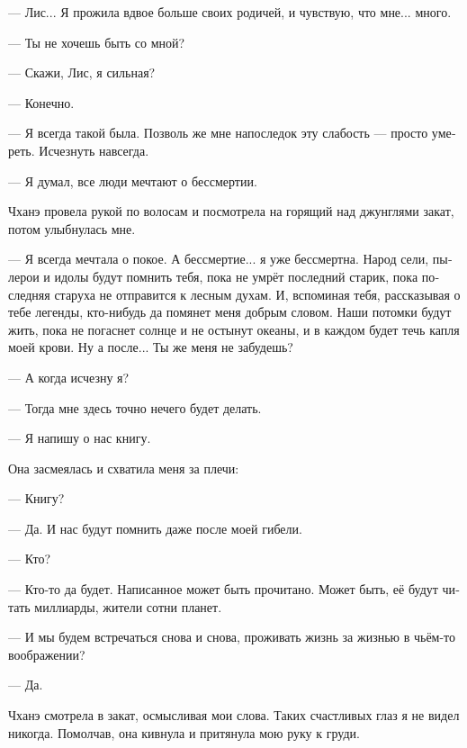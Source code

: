 \documentclass[a4paper,12pt,fleqn]{book}\usepackage{polyglossia}\setdefaultlanguage[babelshorthands=true]{russian}\setotherlanguage{english}\defaultfontfeatures{Ligatures=TeX,Mapping=tex-text}\usepackage{xcolor}\newcommand{\ml}[3]{#2}
\begin{document}
{--- Лис...
Я прожила вдвое больше своих родичей, и чувствую, что мне... много.

--- Ты не хочешь быть со мной?

--- Скажи, Лис, я сильная?

--- Конечно.

--- Я всегда такой была.
Позволь же мне напоследок эту слабость --- просто умереть.
Исчезнуть навсегда.

--- Я думал, все люди мечтают о бессмертии.

Чханэ провела рукой по волосам и посмотрела на горящий над джунглями закат, потом улыбнулась мне.

--- Я всегда мечтала о покое.
А бессмертие... я уже бессмертна.
Народ сели, пылерои и идолы будут помнить тебя, пока не умрёт последний старик, пока последняя старуха не отправится к лесным духам.
И, вспоминая тебя, рассказывая о тебе легенды, кто-нибудь да помянет меня добрым словом.
Наши потомки будут жить, пока не погаснет солнце и не остынут океаны, и в каждом будет течь капля моей крови.
Ну а после...
Ты же меня не забудешь?

--- А когда исчезну я?

--- Тогда мне здесь точно нечего будет делать.

\ml{$0$}
{--- Я напишу о нас книгу.}
{``I'll write a book about us.''}

Она засмеялась и схватила меня за плечи:

\ml{$0$}
{--- Книгу?}
{``A book?''}

\ml{$0$}
{--- Да.}
{``Yes.}
\ml{$0$}
{И нас будут помнить даже после моей гибели.}
{We'll be remembered even after my death.''}

\ml{$0$}
{--- Кто?}
{``But who will remember?''}

\ml{$0$}
{--- Кто-то да будет.}
{``Somebody will.}
\ml{$0$}
{Написанное может быть прочитано.}
{Written might be read.}
\ml{$0$}
{Может быть, её будут читать миллиарды, жители сотни планет.}
{I guess billions of folk, dwellers of hundred planets will read this story.''}

\ml{$0$}
{--- И мы будем встречаться снова и снова, проживать жизнь за жизнью в чьём-то воображении?}
{``And we will meet and meet again, we will live life by life in the mind's eye of somebody, won't we?''}

\ml{$0$}
{--- Да.}
{``Yes, we will.''}

Чханэ смотрела в закат, осмысливая мои слова.
Таких счастливых глаз я не видел никогда.
Помолчав, она кивнула и притянула мою руку к груди.

}
\end{document}
